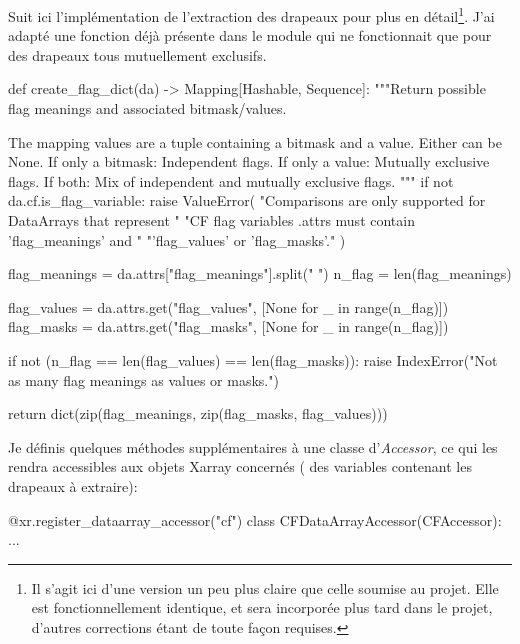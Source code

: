 Suit ici l'implémentation de l'extraction des drapeaux pour  plus en détail\footnote{Il s'agit ici d'une version un peu plus claire que celle soumise au projet. Elle est fonctionnellement identique, et sera incorporée plus tard dans le projet, d'autres corrections étant de toute façon requises.}.
J'ai adapté une fonction déjà présente dans le module qui ne fonctionnait que pour des drapeaux tous mutuellement exclusifs.
\begin{python}
def create_flag_dict(da) -> Mapping[Hashable, Sequence]:
    """Return possible flag meanings and associated bitmask/values.

    The mapping values are a tuple containing a bitmask and a value.
    Either can be None.
    If only a bitmask: Independent flags.
    If only a value: Mutually exclusive flags.
    If both: Mix of independent and mutually exclusive flags.
    """
    if not da.cf.is_flag_variable:
        raise ValueError(
            "Comparisons are only supported for DataArrays that represent "
            "CF flag variables .attrs must contain 'flag_meanings' and "
            "'flag_values' or 'flag_masks'."
        )

    flag_meanings = da.attrs["flag_meanings"].split(" ")
    n_flag = len(flag_meanings)

    flag_values = da.attrs.get("flag_values", [None for _ in range(n_flag)])
    flag_masks = da.attrs.get("flag_masks", [None for _ in range(n_flag)])

    if not (n_flag == len(flag_values) == len(flag_masks)):
        raise IndexError("Not as many flag meanings as values or masks.")

    return dict(zip(flag_meanings, zip(flag_masks, flag_values)))
\end{python}

Je définis quelques méthodes supplémentaires à une classe d'\emph{Accessor}, ce qui les rendra accessibles aux objets Xarray concernés ( des variables  contenant les drapeaux à extraire):
\begin{python}
@xr.register_dataarray_accessor("cf")
class CFDataArrayAccessor(CFAccessor):
    ...
\end{python}

